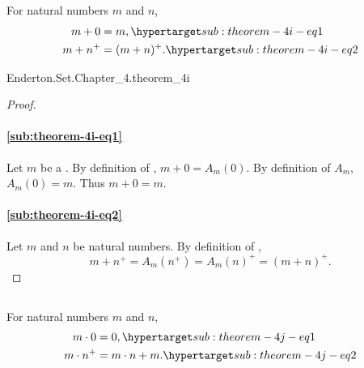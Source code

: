 \documentclass{report}
\begin{document}
\subsection{}

  \begin{theorem}[4I]
    For natural numbers $m$ and $n$,
      \begin{align}
        m + 0 & = m, \hyperlabel{sub:theorem-4i-eq1} \\
        m + n^+ & = (m + n)^+. \hyperlabel{sub:theorem-4i-eq2}
      \end{align}
  \end{theorem}

    {Enderton.Set.Chapter\_4.theorem\_4i}



  \begin{proof}

    \paragraph{\eqref{sub:theorem-4i-eq1}}%

      Let $m$ be a .
      By definition of , $m + 0 = A_m(0)$.
      By definition of $A_m$, $A_m(0) = m$.
      Thus $m + 0 = m$.

    \paragraph{\eqref{sub:theorem-4i-eq2}}%

      Let $m$ and $n$ be natural numbers.
      By definition of ,
        $$m + n^+ = A_m(n^+) = A_m(n)^+ = (m + n)^+.$$

  \end{proof}

\subsection{}

  \begin{theorem}[4J]
    For natural numbers $m$ and $n$,
      \begin{align}
        m \cdot 0 & = 0, \hyperlabel{sub:theorem-4j-eq1} \\
        m \cdot n^+ & = m \cdot n + m. \hyperlabel{sub:theorem-4j-eq2}
      \end{align}
  \end{theorem}
\end{document}
